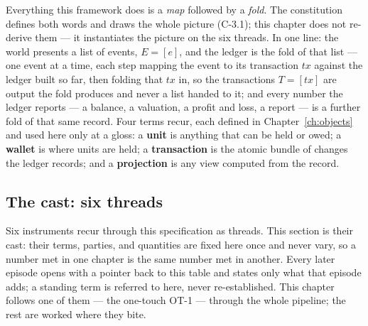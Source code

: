 \documentclass[11pt,a4paper]{article}
\begin{document}
Everything this framework does is a \emph{map} followed by a \emph{fold}. The
constitution defines both words and draws the whole picture (C-3.1); this chapter does
not re-derive them --- it instantiates the picture on the six threads. In one line: the
world presents a list of events, $E = [e]$, and the ledger is the fold of that list ---
one event at a time, each step mapping the event to its transaction $tx$ against the
ledger built so far, then folding that $tx$ in, so the transactions $T = [tx]$ are output
the fold produces and never a list handed to it; and every number the ledger reports ---
a balance, a valuation, a profit and loss, a report --- is a further fold of that same
record. Four terms recur, each defined in Chapter~\ref{ch:objects} and used here
only at a gloss: a \textbf{unit} is anything that can be held or owed; a \textbf{wallet}
is where units are held; a \textbf{transaction} is the atomic bundle of changes the
ledger records; and a \textbf{projection} is any view computed from the record.

\subsection{The cast: six threads}\label{sec:cast}

Six instruments recur through this specification as threads. This section is their cast:
their terms, parties, and quantities are fixed here once and never vary, so a number met in
one chapter is the same number met in another. Every later episode opens with a pointer back
to this table and states only what that episode adds; a standing term is referred to here,
never re-established. This chapter follows one of them --- the one-touch OT-1 --- through the
whole pipeline; the rest are worked where they bite.
\end{document}
